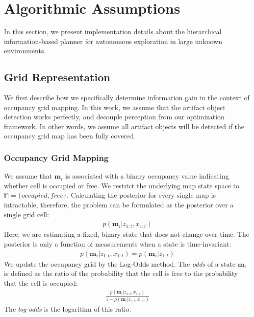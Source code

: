 \documentclass{article}
\newcommand{\todo}[1]{{\color{red} #1 }} %
\begin{document}

\section{Algorithmic Assumptions} \label{sec:hierarchical}

In this section, we present implementation details about the hierarchical information-based planner for autonomous exploration in large unknown environments.

\subsection{Grid Representation}
We first describe how we specifically determine information gain in the context of occupancy grid mapping.  In this work, we assume that the artifact object detection works perfectly, and decouple perception from our optimization framework.
In other words, we assume all artifact objects will be detected if the occupancy grid map has been fully covered.

\subsubsection{Occupancy Grid Mapping}
We assume that $\textbf{m}_i$ is associated with a binary occupancy value indicating whether cell is occupied or free.  We restrict the underlying map state space to $\mathbb{M}=\{occupied, free\}$. Calculating the posterior for every single map is intractable, therefore, the problem can be formulated as the posterior over a single grid cell: 
\begin{align}
    p(\textbf{m}_i | z_{1:t},x_{1:t})
\end{align}
Here, we are estimating a fixed, binary state that does not change over time. The posterior is only a function of measurements when a state is time-invariant:
\begin{align}
    p(\textbf{m}_i | z_{1:t},x_{1:t}) = p(\textbf{m}_i | z_{1:t})
    \label{static}
\end{align}
We update the occupancy grid by the Log-Odds method. The \emph{odds} of a state $\textbf{m}_i$ is defined as the ratio of the probability that the cell is free to the probability that the cell is occupied:
\begin{align}
    \frac{p(\textbf{m}_i | z_{1:t},x_{1:t})}{1-p(\textbf{m}_i | z_{1:t},x_{1:t})}
    \label{odd}
\end{align}
The \emph{log-odds} is the logarithm of this ratio:
\end{document}

